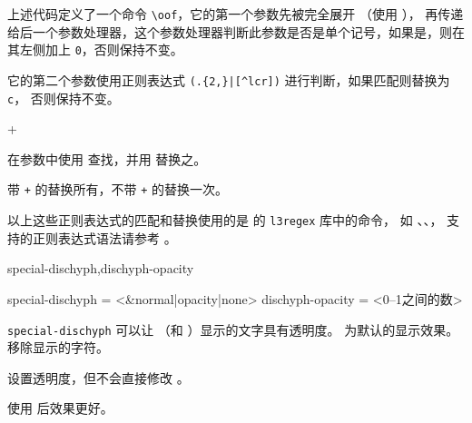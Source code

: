 \documentclass[twoside]{book}
\def\xampletext{\par}
\def\xampleprint{\xamplecode \xampleline \xampletext}
\begin{document}

上述代码定义了一个命令 \verb|\oof|，它的第一个参数先被完全展开
（使用 ），
再传递给后一个参数处理器，这个参数处理器判断此参数是否是单个记号，如果是，则在其左侧加上 
\verb|0|，否则保持不变。

它的第二个参数使用正则表达式 \verb!(.{2,}|[^lcr])! 进行判断，如果匹配则替换为 \verb|c|，
否则保持不变。

\begin{function}{\RegexReplaceArgument}
  \begin{syntax}
    \V\RegexReplaceArgument   {} 
    \V\RegexReplaceArgument +  
  \end{syntax}
在参数中使用  查找，并用  替换之。

带 \texttt{+} 的替换所有，不带 \texttt{+} 的替换一次。
\end{function}


\begin{texnote}
以上这些正则表达式的匹配和替换使用的是 \LaTeXiii 的 \texttt{l3regex} 库中的命令，
如 、、，
支持的正则表达式语法请参考 。
\end{texnote}

\begin{keyval}[path=typo]{special-dischyph,dischyph-opacity}
  \begin{syntax}
    special-dischyph = <&normal|opacity|none>
    dischyph-opacity = <{0--1之间的数}>
  \end{syntax}
\verb|special-dischyph| 可以让 \tn{-} （和 ）显示的文字具有透明度。
 为默认的显示效果。 移除显示的字符。

 设置透明度，但不会直接修改 。

使用  后效果更好。
\end{keyval}
\end{document}
